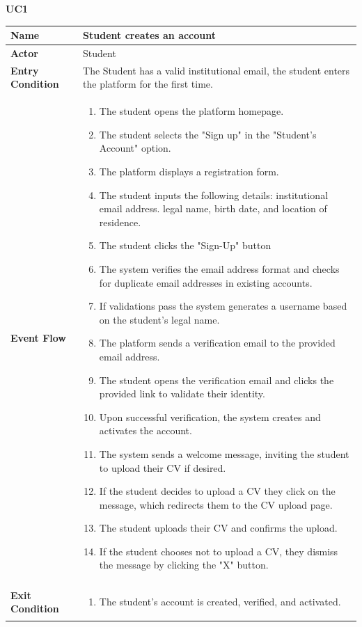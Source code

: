 \textbf{UC1}
\begin{longtable}{|p{}|p{}|}
\hline
\textbf{Name} & Student creates an account \\
\hline
\textbf{Actor} & Student\\
\hline
\textbf{Entry Condition} & The Student has a valid institutional email, the student enters the platform for the first time.\\
\hline
\textbf{Event Flow} & 
\begin{enumerate}
    \item The student opens the platform homepage.
    \item The student selects the "Sign up" in the "Student's Account" option.
    \item The platform displays a registration form.
    \item The student inputs the following details:	institutional email address. legal name, birth date, and location of residence.
    \item The student clicks the "Sign-Up" button
    \item The system verifies the email address format and checks for duplicate email addresses in existing accounts.
    \item  If validations pass the system generates a username based on the student’s legal name.
    \item The platform sends a verification email to the provided email address.
    \item The student opens the verification email and clicks the provided link to validate their identity.
    \item Upon successful verification, the system creates and activates the account.
    \item The system sends a welcome message, inviting the student to upload their CV if desired.
    \item  If the student decides to upload a CV they click on the message, which redirects them to the CV upload page.
    \item The student uploads their CV and confirms the upload.
    \item If the student chooses not to upload a CV, they dismiss the message by clicking the "X" button.
\end{enumerate} \\
\hline
\textbf{Exit Condition} & 
\begin{enumerate}
    \item  The student’s account is created, verified, and activated.
    

\end{enumerate}
\end{longtable}
